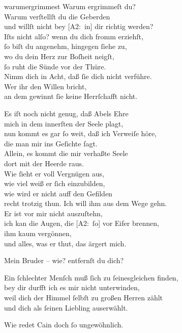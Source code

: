 \documentclass[abbrwidth=6em,tocstyle=ref-genre]{ees}
\newcommand\altlyrics[1]{[\textmd{A2}:~#1]}
\begin{document}
{\clearpage
\begin{movement}{warumergrimmest}
  Warum ergrimmeſt du?\\
  Warum verſtellſt du die Geberden\\
  und willſt nicht bey \altlyrics{in} dir richtig werden?\\
  Iſts nicht alſo? wenn du dich fromm erziehſt,\\
  ſo biſt du angenehm, hingegen ſiehe zu,\\
  wo du dein Herz zur Boſheit neigſt,\\
  ſo ruht die Sünde vor der Thüre.\\
  Nimm dich in Acht, daß ſie dich nicht verführe.\\
  Wer ihr den Willen bricht,\\
  an dem gewinnt ſie keine Herrſchafft nicht.

  \voice[Cain]
  Es iſt noch nicht genug, daß Abels Ehre\\
  mich in dem innerſten der Seele plagt,\\
  nun kommt es gar ſo weit, daß ich Verweiſe höre,\\
  die man mir ins Geſichte ſagt.\\
  Allein, es kommt die mir verhaßte Seele\\
  dort mit der Heerde raus.\\
  Wie ſieht er voll Vergnügen aus,\\
  wie viel weiß er ſich einzubilden,\\
  wie wird er nicht auff den Gefilden\\
  recht trotzig thun. Ich will ihm aus dem Wege gehn.\\
  Er ist vor mir nicht auszuſtehn,\\
  ich kan die Augen, die \altlyrics{ſo} vor Eifer brennen,\\
  ihm kaum vergönnen,\\
  und alles, was er thut, das ärgert mich.

  \voice[Abel]
  Mein Bruder – wie? entfernſt du dich?

  \voice[Cain]
  Ein ſchlechter Menſch muß ſich zu ſeinesgleichen finden,\\
  bey dir durfft ich es mir nicht unterwinden,\\
  weil dich der Himmel ſelbſt zu großen Herren zählt\\
  und dich als ſeinen Liebling auserwählt.

  \voice[Abel]
  Wie redet Cain doch ſo ungewöhnlich.


\end{movement}}
\end{document}
